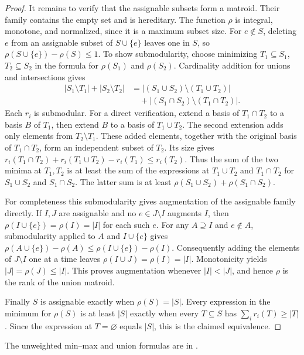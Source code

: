 \documentclass[11pt,oneside,openany]{book}
\theoremstyle{plain}
\theoremstyle{definition}
\theoremstyle{remark}
\begin{document}
\begin{proof}
It remains to verify that the assignable subsets form a matroid.
Their family contains the empty set and is hereditary. The
function \(\rho\) is integral, monotone, and normalized, since
it is a maximum subset size. For \(e\notin S\), deleting \(e\)
from an assignable subset of \(S\cup\{e\}\) leaves one in \(S\),
so \(\rho(S\cup\{e\})-\rho(S)\le1\).
To show submodularity, choose minimizing \(T_1\subseteq S_1\),
\(T_2\subseteq S_2\) in the formula for \(\rho(S_1)\) and
\(\rho(S_2)\). Cardinality addition for unions and intersections
gives
\begin{align*}
 |S_1\setminus T_1|+|S_2\setminus T_2|
 &= |(S_1\cup S_2)\setminus(T_1\cup T_2)|\\
 &\quad+|(S_1\cap S_2)\setminus(T_1\cap T_2)|.
\end{align*}
Each \(r_i\) is submodular. For a direct verification, extend a
basis of \(T_1\cap T_2\) to a basis \(B\) of \(T_1\), then extend
\(B\) to a basis of \(T_1\cup T_2\). The second extension adds
only elements from \(T_2\setminus T_1\). These added elements,
together with the original basis of \(T_1\cap T_2\), form an
independent subset of \(T_2\). Its size gives
\(r_i(T_1\cap T_2)+r_i(T_1\cup T_2)-r_i(T_1)\le r_i(T_2)\).
Thus the sum of the two minima at \(T_1,T_2\) is at least the
sum of the expressions at \(T_1\cup T_2\) and \(T_1\cap T_2\)
for \(S_1\cup S_2\) and \(S_1\cap S_2\). The latter sum is
at least \(\rho(S_1\cup S_2)+\rho(S_1\cap S_2)\).

For completeness this submodularity gives augmentation of the
assignable family directly. If \(I,J\) are assignable and no
\(e\in J\setminus I\) augments \(I\), then
\(\rho(I\cup\{e\})=\rho(I)=|I|\) for each such \(e\).
For any \(A\supseteq I\) and \(e\notin A\), submodularity applied
to \(A\) and \(I\cup\{e\}\) gives
\(\rho(A\cup\{e\})-\rho(A)\le
  \rho(I\cup\{e\})-\rho(I)\).
Consequently adding the elements of \(J\setminus I\) one at a
time leaves \(\rho(I\cup J)=\rho(I)=|I|\). Monotonicity yields
\(|J|=\rho(J)\le |I|\). This proves augmentation whenever
\(|I|<|J|\), and hence \(\rho\) is the rank of the union matroid.

Finally \(S\) is assignable exactly when \(\rho(S)=|S|\).
Every expression in the minimum for \(\rho(S)\) is at least
\(|S|\) exactly when every \(T\subseteq S\) has
\(\sum_i r_i(T)\ge |T|\). Since the expression at
\(T=\varnothing\) equals \(|S|\), this is the claimed equivalence.
\end{proof}

The unweighted min--max and union formulas are in
\cite[Sections~41.1 and 42.1]{schrijver}.
\end{document}
